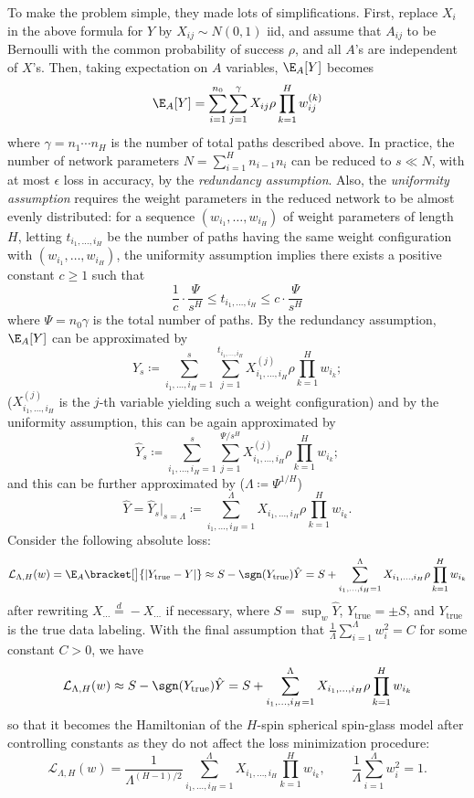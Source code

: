 \documentclass[notitlepage]{report}
\begin{document}
To make the problem simple, they made lots of simplifications. First, replace $X_i$ in the above formula for $Y$ by $X_{ij} \sim N(0,1)$ iid, and assume that $A_{ij}$ to be Bernoulli with the common probability of success $\rho$, and all $A$'s are independent of $X$'s. Then, taking expectation on $A$ variables, $\E_A[Y]$ becomes
\[ \E_A[Y] = \sum_{i=1}^{n_0}\sum_{j=1}^\gamma X_{ij}\rho \prod_{k=1}^H w_{ij}^{(k)} \]
where $\gamma = n_1\cdots n_H$ is the number of total paths described above. In practice, the number of network parameters $N=\sum_{i=1}^H n_{i-1} n_i$ can be reduced to $s \ll N$, with at most $\epsilon$ loss in accuracy, by the \emph{redundancy assumption}. Also, the \emph{uniformity assumption} requires the weight parameters in the reduced network to be almost evenly distributed: for a sequence $(w_{i_1},\dots,w_{i_H})$ of weight parameters of length $H$, letting $t_{i_1,\dots,i_H}$ be the number of paths having the same weight configuration with $(w_{i_1},\dots,w_{i_H})$, the uniformity assumption implies there exists a positive constant $c\ge 1$ such that
\[ \frac 1 c \cdot \frac{\Psi}{s^H} \le t_{i_1,\dots,i_H}  \le c\cdot \frac\Psi {s^H} \]
where $\Psi = n_0\gamma$ is the total number of paths. By the redundancy assumption, $\E_A[Y]$ can be approximated by
\[ Y_s \coloneqq \sum_{i_1,\dots,i_H = 1}^s \sum_{j=1}^{t_{i_1,\dots,i_H}} X_{i_1,\dots,i_H}^{(j)} \rho \prod_{k=1}^H w_{i_k}; \]
($X_{i_1,\dots,i_H}^{(j)}$ is the $j$-th variable yielding such a weight configuration) and by the uniformity assumption, this can be again approximated by
\[ \hat Y_s \coloneqq \sum_{i_1,\dots,i_H = 1}^s \sum_{j=1}^{\Psi/s^H} X_{i_1,\dots,i_H}^{(j)} \rho \prod_{k=1}^H w_{i_k}; \]
and this can be further approximated by ($\Lambda \coloneqq \Psi^{1/H}$)
\[ \hat Y = \hat Y_s|_{s=\Lambda} \coloneqq \sum_{i_1,\dots,i_H = 1}^\Lambda X_{i_1,\dots,i_H} \rho \prod_{k=1}^H w_{i_k}. \]
Consider the following absolute loss:
\[ \mathcal L_{\Lambda,H}(w) = \E_A \bracket[\big]{|Y_{\text{true}} - Y|} \approx S - \sgn(Y_{\text{true}})\hat Y = S + \sum_{i_1,\dots,i_H=1}^\Lambda X_{i_1,\dots,i_H} \rho \prod_{k=1}^H w_{i_k} \]
after rewriting $X_{\cdots}\stackrel{d}{=} -X_{\cdots}$ if necessary, where $ S =  \sup_{w} \hat Y$, $Y_{\text{true}} = \pm S$, and $Y_{\text{true}}$ is the true data labeling. With the final assumption that $\frac 1 \Lambda \sum_{i=1}^\Lambda w_i^2 = C$ for some constant $C>0$, we have
\[ \mathcal L_{\Lambda,H}(w) \approx S - \sgn(Y_{\text{true}})\hat Y = S + \sum_{i_1,\dots,i_H=1}^\Lambda X_{i_1,\dots,i_H} \rho \prod_{k=1}^H w_{i_k} \]
so that it becomes the Hamiltonian of the $H$-spin spherical spin-glass model after controlling constants as they do not affect the loss minimization procedure:
\[ \mathcal L_{\Lambda,H}(w) = \frac{1}{\Lambda^{(H-1)/2}} \sum_{i_1,\dots,i_H=1}^\Lambda X_{i_1,\dots,i_H} \prod_{k=1}^H w_{i_k},\qquad \frac1\Lambda \sum_{i=1}^\Lambda w_i^2 = 1. \]
\end{document}
